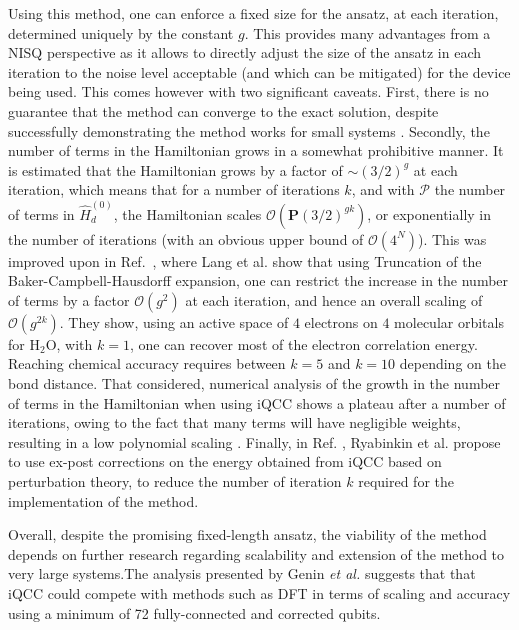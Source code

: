 Using this method, one can enforce a fixed size for the ansatz, at each iteration, determined uniquely by the constant $g$. This provides many advantages from a NISQ perspective as it allows to directly adjust the size of the ansatz in each iteration to the noise level acceptable (and which can be mitigated) for the device being used.
This comes however with two significant caveats. First, there is no guarantee that the method can converge to the exact solution, despite successfully demonstrating the method works for small systems \cite{Ryabinkin2020}. Secondly, the number of terms in the Hamiltonian grows in a somewhat prohibitive manner. It is estimated that the Hamiltonian grows by a factor of $\sim (3/2)^{g}$ at each iteration, which means that for a number of iterations $k$, and with $\mathcal{P}$ the number of terms in $\hat{H}_d^{(0)}$, the Hamiltonian scales $\mathcal{O}(\boldsymbol{P}(3/2)^{g k})$, or exponentially in the number of iterations (with an obvious upper bound of $\mathcal{O}(4^N)$).
This was improved upon in Ref.~\cite{Lang2020}, where Lang et al. show that using Truncation of the  Baker-Campbell-Hausdorff expansion, one can restrict the increase in the number of terms by a factor $\mathcal{O}(g^2)$ at each iteration, and hence an overall scaling of  $\mathcal{O}(g^{2k})$. They show, using an active space of $4$ electrons on $4$ molecular orbitals for $\mathrm{H_2O}$, with $k=1$, one can recover most of the electron correlation energy. Reaching chemical accuracy requires between $k=5$ and $k=10$ depending on the bond distance. That considered, numerical analysis of the growth in the number of terms in the Hamiltonian when using iQCC shows a plateau after a number of iterations, owing to the fact that many terms will have negligible weights, resulting in a low polynomial scaling \cite{Genin2022}. Finally, in Ref. \cite{Ryabinkin2021}, Ryabinkin et al. propose to use ex-post corrections on the energy obtained from iQCC based on perturbation theory, to reduce the number of iteration $k$ required for the implementation of the method.

Overall, despite the promising fixed-length ansatz, the viability of the method depends on further research regarding scalability and extension of the method to very large systems.The analysis presented by Genin {\it et al.}  \cite{Genin2022} suggests that that iQCC could compete with methods such as DFT in terms of scaling and accuracy using a minimum of 72 fully-connected and corrected qubits. 

